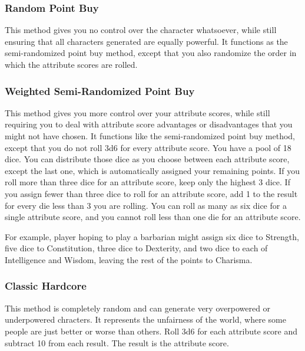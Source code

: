\subsubsection{Random Point Buy}
This method gives you no control over the character whatsoever, while still ensuring that all characters generated are equally powerful. It functions as the semi-randomized point buy method, except that you also randomize the order in which the attribute scores are rolled.

\subsubsection{Weighted Semi-Randomized Point Buy}
This method gives you more control over your attribute scores, while still requiring you to deal with attribute score advantages or disadvantages that you might not have chosen. It functions like the semi-randomized point buy method, except that you do not roll 3d6 for every attribute score. You have a pool of 18 dice. You can distribute those dice as you choose between each attribute score, except the last one, which is automatically assigned your remaining points. If you roll more than three dice for an attribute score, keep only the highest 3 dice. If you assign fewer than three dice to roll for an attribute score, add 1 to the result for every die less than 3 you are rolling. You can roll as many as six dice for a single attribute score, and you cannot roll less than one die for an attribute score.

For example, player hoping to play a barbarian might assign six dice to Strength, five dice to Constitution, three dice to Dexterity, and two dice to each of Intelligence and Wisdom, leaving the rest of the points to Charisma.

\subsubsection{Classic Hardcore}

This method is completely random and can generate very overpowered or underpowered chracters. It represents the unfairness of the world, where some people are just better or worse than others. Roll 3d6 for each attribute score and subtract 10 from each result. The result is the attribute score.